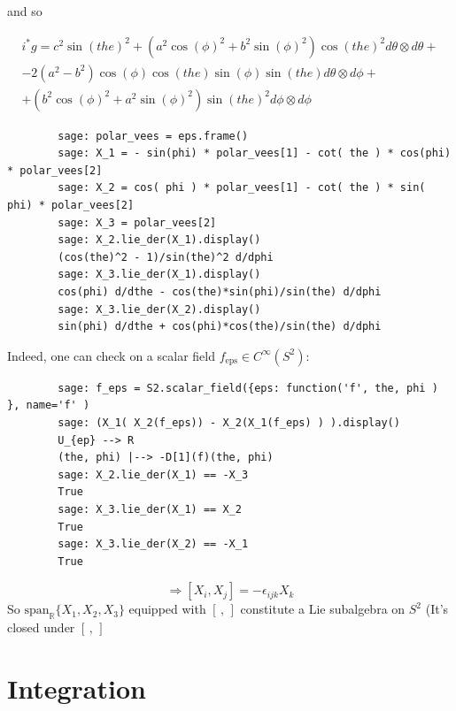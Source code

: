 \documentclass[10pt]{amsart}
\newcommand{\questionhead}[1]
  {\bigskip\bigskip
   \noindent{\small\bf Question #1.}
   \bigskip}
\begin{document}
\begin{multicols*}{2}
	and so
	
	\[
	\boxed{ \begin{gathered}
		i^* g = c^{2} \sin\left(\mathit{the}\right)^{2} + {\left(a^{2} \cos\left(\phi\right)^{2} + b^{2} \sin\left(\phi\right)^{2}\right)} \cos\left(\mathit{the}\right)^{2} d\theta \otimes d\theta + \\
		-2 {\left(a^{2} - b^{2}\right)} \cos\left(\phi\right) \cos\left(\mathit{the}\right) \sin\left(\phi\right) \sin\left(\mathit{the}\right) d\theta \otimes d\phi +  \\
		+ {\left(b^{2} \cos\left(\phi\right)^{2} + a^{2} \sin\left(\phi\right)^{2}\right)} \sin\left(\mathit{the}\right)^{2} d\phi \otimes d\phi 
		\end{gathered} }
	\]
	
	\questionhead{}
	
	{\small
		\begin{verbatim}
		sage: polar_vees = eps.frame()
		sage: X_1 = - sin(phi) * polar_vees[1] - cot( the ) * cos(phi) * polar_vees[2]
		sage: X_2 = cos( phi ) * polar_vees[1] - cot( the ) * sin( phi) * polar_vees[2]
		sage: X_3 = polar_vees[2]
		sage: X_2.lie_der(X_1).display()
		(cos(the)^2 - 1)/sin(the)^2 d/dphi
		sage: X_3.lie_der(X_1).display()
		cos(phi) d/dthe - cos(the)*sin(phi)/sin(the) d/dphi
		sage: X_3.lie_der(X_2).display()
		sin(phi) d/dthe + cos(phi)*cos(the)/sin(the) d/dphi
		\end{verbatim}
	}
	
	Indeed, one can check on a scalar field $f_{\text{eps}} \in C^{\infty}(S^2)$:
	{\small
		\begin{verbatim}
		sage: f_eps = S2.scalar_field({eps: function('f', the, phi ) }, name='f' )
		sage: (X_1( X_2(f_eps)) - X_2(X_1(f_eps) ) ).display()
		U_{ep} --> R
		(the, phi) |--> -D[1](f)(the, phi)
		sage: X_2.lie_der(X_1) == -X_3
		True
		sage: X_3.lie_der(X_1) == X_2
		True
		sage: X_3.lie_der(X_2) == -X_1
		True
		\end{verbatim}
	}
	
	\[
	\Longrightarrow \boxed{ [X_i, X_j] = -\epsilon_{ijk}X_k }
	\]
	So $\text{span}_{\mathbb{R}} \lbrace X_1,X_2,X_3 \rbrace$ equipped with $[ \, , \, ]$ constitute a Lie subalgebra on $S^2$ (It's closed under $[ \, , \, ]$
	
	\section{Integration}
	
	\subsection{}
	

\end{multicols*}
\end{document}
